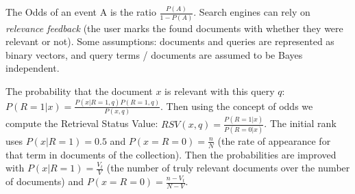 The Odds of an event A is the ratio $\frac {P(A)} {1 - P(A)}$.
Search engines can rely on \textit{relevance feedback} (the user marks the found documents with whether they were relevant or not).
Some assumptions: documents and queries are represented as binary vectors, and query terms / documents are assumed to be Bayes independent.

The probability that the document $x$ is relevant with this query $q$: $P(R = 1|x) = \frac {P(x|R = 1, q)P(R = 1, q)} {P(x, q)}$.
Then using the concept of odds we compute the Retrieval Status Value: $RSV(x, q) = \frac {P(R = 1|x)} {P(R = 0|x)}$.
The initial rank uses $P(x|R=1)=0.5$ and $P(x=R=0)=\frac {n}{N}$ (the rate of appearance for that term in documents of the collection).
Then the probabilities are improved with $P(x|R=1)=\frac {V_t} {V}$ (the number of truly relevant documents over the number of documents) and $P(x=R=0)=\frac {n - V_t}{N - V}$.
